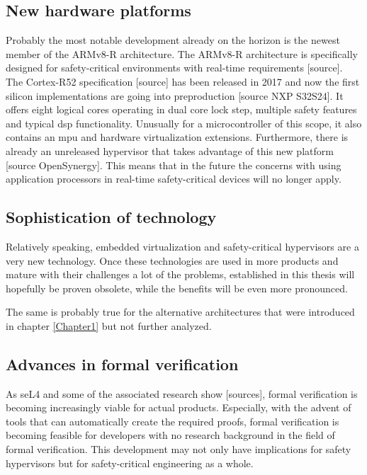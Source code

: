 \subsection{New hardware platforms} \label{cortex-r52-hypervisor}
Probably the most notable development already on the horizon is the newest member of the ARMv8-R architecture. The ARMv8-R architecture is specifically designed for safety-critical environments with real-time requirements [source]. %
The Cortex-R52 specification [source] has been released in 2017 and now the first silicon implementations are going into preproduction [source NXP S32S24]. It offers eight logical cores operating in dual core lock step, multiple safety features and typical \acrshort{dsp} functionality. Unusually for a microcontroller of this scope, it also contains an \acrshort{mpu} and hardware virtualization extensions. Furthermore, there is already an unreleased hypervisor that takes advantage of this new platform [source OpenSynergy]. This means that in the future the concerns with using application processors in real-time safety-critical devices will no longer apply.

\subsection{Sophistication of technology}
Relatively speaking, embedded virtualization and safety-critical hypervisors are a very new technology. Once these technologies are used in more products and mature with their challenges a lot of the problems, established in this thesis will hopefully be proven obsolete, while the benefits will be even more pronounced. 

The same is probably true for the alternative architectures that were introduced in chapter \ref{Chapter1} but not further analyzed.
\subsection{Advances in formal verification}
As seL4 and some of the associated research show [sources], formal verification is becoming increasingly viable for actual products. Especially, with the advent of tools that can automatically create the required proofs, formal verification is becoming feasible for developers with no research background in the field of formal verification. This development may not only have implications for safety hypervisors but for safety-critical engineering as a whole.

